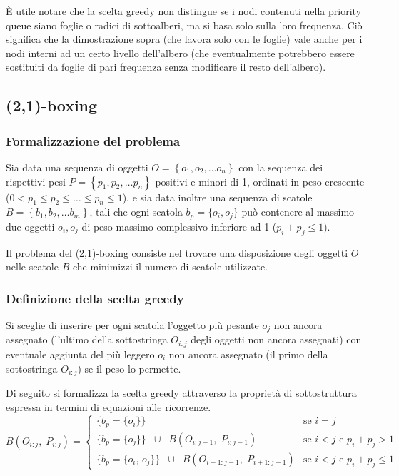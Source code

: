 È utile notare che la scelta greedy non distingue se i nodi contenuti nella priority queue siano foglie o radici di
sottoalberi, ma si basa solo sulla loro frequenza. Ciò significa che la dimostrazione sopra (che lavora solo con le foglie)
vale anche per i nodi interni ad un certo livello dell'albero (che eventualmente potrebbero essere sostituiti da foglie
di pari frequenza senza modificare il resto dell'albero).

\newpage

\subsection{(2,1)-boxing}
\subsubsection*{Formalizzazione del problema}
Sia data una sequenza di oggetti \(O = \left\{ o_1, o_2, \dots o_n \right\}\) con la sequenza dei rispettivi pesi
\(P = \left\{ p_1, p_2, \dots p_n \right\}\) positivi e minori di 1, ordinati in peso crescente (\(0 < p_1 \leq p_2 \leq \dots \leq p_n \leq 1\)),
e sia data inoltre una sequenza di scatole \(B = \left\{ b_1, b_2, \dots b_m \right\}\), tali che ogni scatola
\(b_p = \{ o_i, o_j \}\) può contenere al massimo due oggetti \(o_i, o_j\) di peso massimo complessivo inferiore ad 1 (\(p_i + p_j \leq 1\)).

Il problema del (2,1)-boxing consiste nel trovare una disposizione degli oggetti \(O\) nelle scatole \(B\) che minimizzi
il numero di scatole utilizzate.

\subsubsection*{Definizione della scelta greedy}
Si sceglie di inserire per ogni scatola l'oggetto più pesante \(o_j\) non ancora assegnato (l'ultimo della sottostringa
\(O_{i:j}\) degli oggetti non ancora assegnati) con eventuale aggiunta del più leggero \(o_i\) non ancora assegnato (il
primo della sottostringa \(O_{i:j}\)) se il peso lo permette.

Di seguito si formalizza la scelta greedy attraverso la proprietà di sottostruttura espressa in termini di equazioni alle
ricorrenze.
\[B(O_{i:j}, \; P_{i:j}) = \begin{cases}
	\{b_p = \{o_i\}\} & \text{se } i = j \\[3pt]
	\{b_p = \{o_j\}\} \;\; \cup \;\; B(O_{i:j-1}, \; P_{i:j-1}) & \text{se } i < j \text{ e } p_i + p_j > 1 \\[3pt]
	\{b_p = \{o_i, \, o_j\}\} \;\; \cup \;\; B(O_{i+1:j-1}, \; P_{i+1:j-1}) & \text{se } i < j \text{ e } p_i + p_j \leq 1
\end{cases}\]

